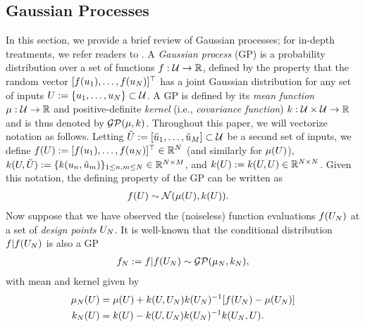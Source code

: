 \documentclass[12pt]{article}
\begin{document}
\subsection{Gaussian Processes}
In this section, we provide a brief review of Gaussian processes; for in-depth treatments, we refer readers to 
\cite{gramacy2020surrogates, StuartTeck2, gpML}. A \textit{Gaussian process} (GP) is a probability 
distribution over a set of functions $\func: \parSpace \to \R$, defined by the property that 
the random vector $[\func(\Par_1), \dots, \func(\Par_\Ndesign)]^\top$ has
a joint Gaussian distribution for any set of inputs $\parMat := \{\Par_1, \dots, \Par_\Ndesign\} \subset \parSpace$. 
A GP is defined by its \textit{mean function} $\gpMeanPrior: \parSpace \to \R$ and positive-definite \textit{kernel} 
(i.e., \textit{covariance function}) $\gpKerPrior: \parSpace \times \parSpace \to \R$ and is thus denoted by 
$\GP(\gpMeanPrior, \gpKerPrior)$. Throughout this paper, we will vectorize notation as follows. Letting 
$\tilde{\parMat} := [\tilde{\Par}_1, \dots, \tilde{\Par}_M]  \subset \parSpace$ be a second set of inputs, we define 
$\func(\parMat) := [\func(\Par_1), \dots, \func(\Par_\Ndesign)]^\top \in \R^{\Ndesign}$ (and similarly for $\gpMeanPrior(\parMat)$), 
$\gpKerPrior(\parMat, \tilde{\parMat}) := \{\gpKerPrior(\Par_{\idxDesign}, \tilde{\Par}_m)\}_{1 \leq \idxDesign, m \leq \Ndesign} \in \R^{\Ndesign \times M}$, 
and $\gpKerPrior(\parMat) := \gpKerPrior(\parMat, \parMat) \in \R^{\Ndesign \times \Ndesign}$. Given this notation, 
the defining property of the GP can be written as 
\begin{align}
\func(\parMat) &\sim \Gaussian(\gpMeanPrior(\parMat), \gpKerPrior(\parMat)).
\end{align}
Now suppose that we have observed the (noiseless) function evaluations $\func(\designIn)$ at a set of \textit{design points} $\designIn$. 
It is well-known \cite{gpML} that the conditional distribution $\func|\func(\designIn)$ is also a GP
\begin{align}
\funcEm[\Ndesign] := \func|\func(\designIn) \sim \GP(\gpMean[\Ndesign], \gpKer[\Ndesign]),
\end{align}
with mean and kernel given by 
\begin{align}
\gpMean[\Ndesign](\parMat) &= \gpMeanPrior(\parMat) + \gpKerPrior(\parMat, \designIn) \gpKerPrior(\designIn)^{-1} [\func(\designIn) - \gpMeanPrior(\designIn)] \label{kriging_eqns} \\
\gpKer[\Ndesign](\parMat) &= \gpKerPrior(\parMat) - \gpKerPrior(\parMat, \designIn) \gpKerPrior(\designIn)^{-1} \gpKerPrior(\designIn, \parMat). \nonumber
\end{align}
\end{document}
